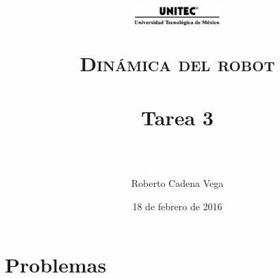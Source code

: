 



\title{
	\normalfont \normalsize
	\begin{figure}[h]
		\begin{center}
			\includegraphics[width=0.3\textwidth]{../images/UNITEC.png}
		\end{center}
	\end{figure}
	\textsc{Dinámica del robot} \\ [25pt]
	\horrule{0.5pt} \\[0.4cm] %
	\huge Tarea 3 \\ %
	\horrule{2pt} \\[0.5cm] %
}

\author{Roberto Cadena Vega} %

\date{\normalsize 18 de febrero de 2016} %




\maketitle %


\section{Problemas}

